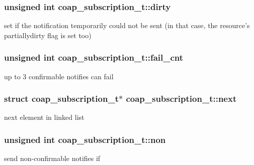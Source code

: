 \subsubsection[{dirty}]{\setlength{\rightskip}{0pt plus 5cm}unsigned int coap\+\_\+subscription\+\_\+t\+::dirty}\label{structcoap__subscription__t_aa330d1abe6d6690e0d1e7af528a02133}
set if the notification temporarily could not be sent (in that case, the resource's partiallydirty flag is set too) \hypertarget{structcoap__subscription__t_a83676881b25552592d3cb34e6d98431a}{}
\subsubsection[{fail\+\_\+cnt}]{\setlength{\rightskip}{0pt plus 5cm}unsigned int coap\+\_\+subscription\+\_\+t\+::fail\+\_\+cnt}\label{structcoap__subscription__t_a83676881b25552592d3cb34e6d98431a}
up to 3 confirmable notifies can fail \hypertarget{structcoap__subscription__t_aa751cbb82d18f3d8285ef5dcaa577d47}{}
\subsubsection[{next}]{\setlength{\rightskip}{0pt plus 5cm}struct {\bf coap\+\_\+subscription\+\_\+t}$\ast$ coap\+\_\+subscription\+\_\+t\+::next}\label{structcoap__subscription__t_aa751cbb82d18f3d8285ef5dcaa577d47}
next element in linked list \hypertarget{structcoap__subscription__t_a50940aab24e1d5514a1d67f0e5341c86}{}
\subsubsection[{non}]{\setlength{\rightskip}{0pt plus 5cm}unsigned int coap\+\_\+subscription\+\_\+t\+::non}\label{structcoap__subscription__t_a50940aab24e1d5514a1d67f0e5341c86}
send non-\/confirmable notifies if {} \hypertarget{structcoap__subscription__t_a8c83fc8034daa9f5c88b943698eeb466}{}
